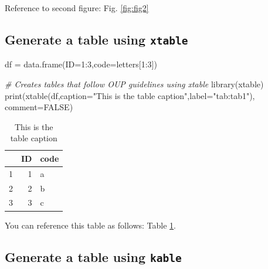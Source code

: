 \documentclass[12pt,halfline,a4paper,]{ouparticle}
\newenvironment{Shaded}{\begin{snugshade}}{\end{snugshade}}
\newcommand{\AttributeTok}[1]{\textcolor[rgb]{0.77,0.63,0.00}{#1}}
\newcommand{\CommentTok}[1]{\textcolor[rgb]{0.56,0.35,0.01}{\textit{#1}}}
\newcommand{\ConstantTok}[1]{\textcolor[rgb]{0.00,0.00,0.00}{#1}}
\newcommand{\DecValTok}[1]{\textcolor[rgb]{0.00,0.00,0.81}{#1}}
\newcommand{\FunctionTok}[1]{\textcolor[rgb]{0.00,0.00,0.00}{#1}}
\newcommand{\NormalTok}[1]{#1}
\newcommand{\OtherTok}[1]{\textcolor[rgb]{0.56,0.35,0.01}{#1}}
\newcommand{\SpecialCharTok}[1]{\textcolor[rgb]{0.00,0.00,0.00}{#1}}
\newcommand{\StringTok}[1]{\textcolor[rgb]{0.31,0.60,0.02}{#1}}
\begin{document}
Reference to second figure: Fig. \ref{fig:fig2}

\hypertarget{generate-a-table-using-xtable}{%
\subsection{\texorpdfstring{Generate a table using
\texttt{xtable}}{Generate a table using xtable}}\label{generate-a-table-using-xtable}}

\begin{Shaded}
\begin{Highlighting}[]
\NormalTok{df }\OtherTok{=} \FunctionTok{data.frame}\NormalTok{(}\AttributeTok{ID=}\DecValTok{1}\SpecialCharTok{:}\DecValTok{3}\NormalTok{,}\AttributeTok{code=}\NormalTok{letters[}\DecValTok{1}\SpecialCharTok{:}\DecValTok{3}\NormalTok{])}

\CommentTok{\# Creates tables that follow OUP guidelines using xtable}
\FunctionTok{library}\NormalTok{(xtable) }
\FunctionTok{print}\NormalTok{(}\FunctionTok{xtable}\NormalTok{(df,}\AttributeTok{caption=}\StringTok{"This is the table caption"}\NormalTok{,}\AttributeTok{label=}\StringTok{"tab:tab1"}\NormalTok{),}
      \AttributeTok{comment=}\ConstantTok{FALSE}\NormalTok{)}
\end{Highlighting}
\end{Shaded}

\begin{table}[ht]
\centering
\begin{tabular}{rrl}
  \hline
 & ID & code \\ 
  \hline
1 &   1 & a \\ 
  2 &   2 & b \\ 
  3 &   3 & c \\ 
   \hline
\end{tabular}
\caption{This is the table caption} 
\label{tab:tab1}
\end{table}

You can reference this table as follows: Table \ref{tab:tab1}.

\hypertarget{generate-a-table-using-kable}{%
\subsection{\texorpdfstring{Generate a table using
\texttt{kable}}{Generate a table using kable}}\label{generate-a-table-using-kable}}
\end{document}
